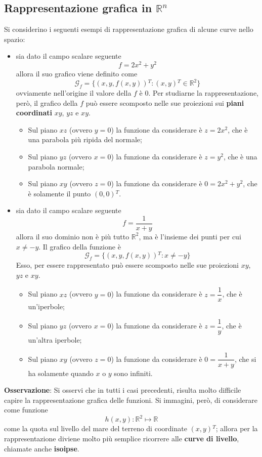 \documentclass[a4paper]{extarticle}
\begin{document}
\vspace{1em}
\noindent
\subsection{Rappresentazione grafica in $\mathbb{R}^n$}
Si considerino i seguenti esempi di rappresentazione grafica di alcune curve nello spazio:
\begin{itemize}
    \item sia dato il campo scalare seguente
    \[f=2x^2+y^2\]
    allora il suo grafico viene definito come
    \[\mathcal{G}_f = \{(x,y,f(x,y)){^T} : (x,y){^T} \in \mathbb{R}^2\}\]
    ovviamente nell'origine il valore della $f$ è $0$. Per studiarne la rappresentazione, però, il grafico della $f$ può essere scomposto nelle sue proiezioni sui \textbf{piani coordinati} $xy$, $yz$ e $xy$.
    \begin{itemize}
        \item Sul piano $xz$ (ovvero $y=0$) la funzione da considerare è $z=2x^2$, che è una parabola più ripida del normale;
        \item Sul piano $yz$ (ovvero $x=0$) la funzione da considerare è $z=y^2$, che è una parabola normale;
        \item Sul piano $xy$ (ovvero $z=0$) la funzione da considerare è $0=2x^2+y^2$, che è solamente il punto $(0,0){^T}$.
    \end{itemize}

    \item sia dato il campo scalare seguente
    \[f=\dfrac{1}{x+y}\]
    allora il suo dominio non è più tutto $\mathbb{R}^2$, ma è l'insieme dei punti per cui $x \neq -y$. Il grafico della funzione è
    \[\mathcal{G}_f = \{(x,y,f(x,y)){^T} : x \neq -y\}\]
    Esso, per essere rappresentato può essere scomposto nelle sue proiezioni $xy$, $yz$ e $xy$.
    \begin{itemize}
        \item Sul piano $xz$ (ovvero $y=0$) la funzione da considerare è $z=\dfrac{1}{x}$, che è un'iperbole;
        \item Sul piano $yz$ (ovvero $x=0$) la funzione da considerare è $z=\dfrac{1}{y}$, che è un'altra iperbole;
        \item Sul piano $xy$ (ovvero $z=0$) la funzione da considerare è $0=\dfrac{1}{x+y}$, che si ha solamente quando $x$ o $y$ sono infiniti.
    \end{itemize}
\end{itemize}

\vspace{1em}
\noindent
\textbf{Osservazione}: Si osservi che in tutti i casi precedenti, risulta molto difficile capire la rappresentazione grafica delle funzioni. Si immagini, però, di considerare come funzione
\[h(x,y) : \mathbb{R}^2 \longmapsto \mathbb{R}\]
come la quota sul livello del mare del terreno di coordinate $(x,y){^T}$; allora per la rappresentazione diviene molto più semplice ricorrere alle \textbf{curve di livello}, chiamate anche \textbf{isoipse}.
\end{document}
